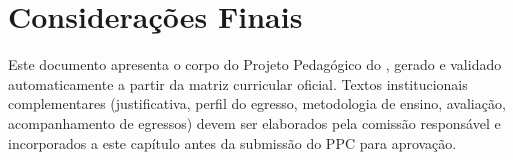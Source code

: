 \chapter{Considerações Finais}

Este documento apresenta o corpo do Projeto Pedagógico do \ppccurso,
gerado e validado automaticamente a partir da matriz curricular oficial.
Textos institucionais complementares (justificativa, perfil do egresso,
metodologia de ensino, avaliação, acompanhamento de egressos) devem ser
elaborados pela comissão responsável e incorporados a este capítulo antes
da submissão do PPC para aprovação.

